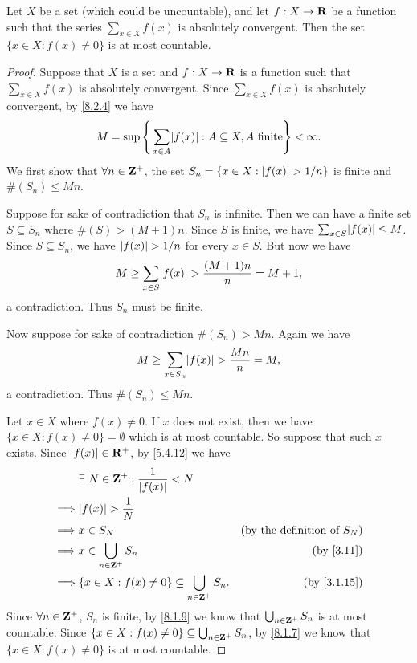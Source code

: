 \begin{lemma}\label{8.2.5}
  Let \(X\) be a set (which could be uncountable), and let \(f : X \to \mathbf{R}\) be a function such that the series \(\sum_{x \in X} f(x)\) is absolutely convergent.
  Then the set \(\{x \in X : f(x) \neq 0\}\) is at most countable.
\end{lemma}

\begin{proof}
  Suppose that \(X\) is a set and \(f : X \to \mathbf{R}\) is a function such that \(\sum_{x \in X} f(x)\) is absolutely convergent.
  Since \(\sum_{x \in X} f(x)\) is absolutely convergent, by \cref{8.2.4} we have
  \[
    M = \sup\Bigg\{\sum_{x \in A} \abs{f(x)} : A \subseteq X, A \text{ finite}\Bigg\} < \infty.
  \]
  We first show that \(\forall n \in \mathbf{Z}^+\), the set \(S_n = \{x \in X : \left\lvert f(x)\right\rvert > 1 / n\}\) is finite and \(\#(S_n) \leq Mn\).

  Suppose for sake of contradiction that \(S_n\) is infinite.
  Then we can have a finite set \(S \subseteq S_n\) where \(\#(S) > (M + 1)n\).
  Since \(S\) is finite, we have \(\sum_{x \in S} \abs{f(x)} \leq M\).
  Since \(S \subseteq S_n\), we have \(\left\lvert f(x)\right\rvert > 1 / n\) for every \(x \in S\).
  But now we have
  \[
    M \geq \sum_{x \in S} \abs{f(x)} > \frac{(M + 1)n}{n} = M + 1,
  \]
  a contradiction.
  Thus \(S_n\) must be finite.

  Now suppose for sake of contradiction \(\#(S_n) > Mn\).
  Again we have
  \[
    M \geq \sum_{x \in S_n} \abs{f(x)} > \frac{Mn}{n} = M,
  \]
  a contradiction.
  Thus \(\#(S_n) \leq Mn\).

  Let \(x \in X\) where \(f(x) \neq 0\).
  If \(x\) does not exist, then we have \(\{x \in X : f(x) \neq 0\} = \emptyset\) which is at most countable.
  So suppose that such \(x\) exists.
  Since \(\left\lvert f(x)\right\rvert \in \mathbf{R}^+\), by \cref{5.4.12} we have
  \begin{align*}
             & \exists\ N \in \Z^+ : \frac{1}{\abs{f(x)}} < N                                                        \\
    \implies & \abs{f(x)} > \frac{1}{N}                                                                              \\
    \implies & x \in S_N                                                     & \text{(by the definition of \(S_N\))} \\
    \implies & x \in \bigcup_{n \in \Z^+} S_n                                & \text{(by \cref{3.11})}               \\
    \implies & \{x \in X : f(x) \neq 0\} \subseteq \bigcup_{n \in \Z^+} S_n. & \text{(by \cref{3.1.15})}
  \end{align*}
  Since \(\forall n \in \mathbf{Z}^+\), \(S_n\) is finite, by \cref{8.1.9} we know that \(\bigcup_{n \in \mathbf{Z}^+} S_n\) is at most countable.
  Since \(\{x \in X : f(x) \neq 0\} \subseteq \bigcup_{n \in \mathbf{Z}^+} S_n\), by \cref{8.1.7} we know that \(\{x \in X : f(x) \neq 0\}\) is at most countable.
\end{proof}

